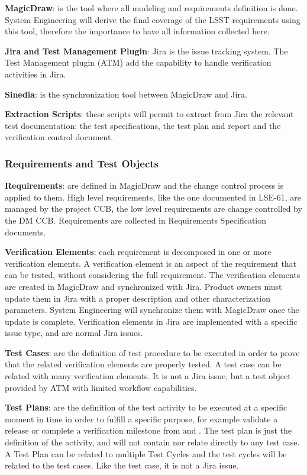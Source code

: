 {\bf MagicDraw}: is the tool where all modeling and requirements definition is done. System Engineering will derive the final coverage of the LSST requirements using this tool, therefore the importance to have all information collected here.

{\bf Jira and Test Management Plugin}: Jira is the issue tracking system. The Test Management plugin (ATM) add the capability to handle verification activities in Jira.

{\bf Sinedia}: is the synchronization tool between MagicDraw and Jira.

{\bf Extraction Scripts}: these scripts will permit to extract from Jira the relevant test documentation: the test specifications, the test plan and report and the verification control document.


\subsubsection{Requirements and Test Objects}\label{sect:testobjects}

{\bf Requirements}: are defined in MagicDraw and the change control process is applied to them. High level requirements, like the one documented in LSE-61, are managed by the project CCB, the low level requirements are change controlled by the DM CCB.
Requirements are collected in Requirements Specification documents.

{\bf Verification Elements}: each requirement is decomposed in one or more verification elements. A verification element is an aspect of the requirement that can be tested, without considering the full requirement.
The verification elements are created in MagicDraw and synchronized with Jira.
Product owners must update them in Jira with a proper description and other characterization parameters.
System Engineering will synchronize them with MagicDraw once the update is complete.
Verification elements in Jira are implemented with a specific issue type, and are normal Jira issues.

{\bf Test Cases}: are the definition of test procedure to be executed in order to prove that the related verification elements are properly tested. A test case can be related with many verification elements. 
It is not a Jira issue, but a test object provided by ATM with limited workflow capabilities.

{\bf Test Plans}: are the definition of the test activity to be executed at a specific moment in time in order to fulfill a specific purpose, for example validate a release or complete a verification milestone from  and .
The test plan is just the definition of the activity, and will not contain nor relate directly to any test case.
A Test Plan can be related to multiple Test Cycles and the test cycles will be related to the test cases.
Like the test case, it is not a Jira issue.

